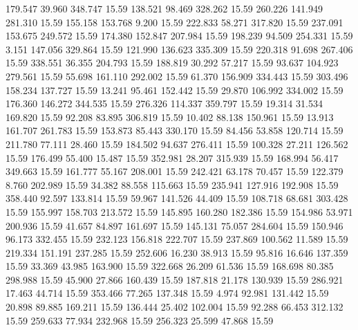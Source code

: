  179.547   39.960  348.747        15.59
 138.521   98.469  328.262        15.59
 260.226  141.949  281.310        15.59
 155.158  153.768    9.200        15.59
 222.833   58.271  317.820        15.59
 237.091  153.675  249.572        15.59
 174.380  152.847  207.984        15.59
 198.239   94.509  254.331        15.59
   3.151  147.056  329.864        15.59
 121.990  136.623  335.309        15.59
 220.318   91.698  267.406        15.59
 338.551   36.355  204.793        15.59
 188.819   30.292   57.217        15.59
  93.637  104.923  279.561        15.59
  55.698  161.110  292.002        15.59
  61.370  156.909  334.443        15.59
 303.496  158.234  137.727        15.59
  13.241   95.461  152.442        15.59
  29.870  106.992  334.002        15.59
 176.360  146.272  344.535        15.59
 276.326  114.337  359.797        15.59
  19.314   31.534  169.820        15.59
  92.208   83.895  306.819        15.59
  10.402   88.138  150.961        15.59
  13.913  161.707  261.783        15.59
 153.873   85.443  330.170        15.59
  84.456   53.858  120.714        15.59
 211.780   77.111   28.460        15.59
 184.502   94.637  276.411        15.59
 100.328   27.211  126.562        15.59
 176.499   55.400   15.487        15.59
 352.981   28.207  315.939        15.59
 168.994   56.417  349.663        15.59
 161.777   55.167  208.001        15.59
 242.421   63.178   70.457        15.59
 122.379    8.760  202.989        15.59
  34.382   88.558  115.663        15.59
 235.941  127.916  192.908        15.59
 358.440   92.597  133.814        15.59
  59.967  141.526   44.409        15.59
 108.718   68.681  303.428        15.59
 155.997  158.703  213.572        15.59
 145.895  160.280  182.386        15.59
 154.986   53.971  200.936        15.59
  41.657   84.897  161.697        15.59
 145.131   75.057  284.604        15.59
 150.946   96.173  332.455        15.59
 232.123  156.818  222.707        15.59
 237.869  100.562   11.589        15.59
 219.334  151.191  237.285        15.59
 252.606   16.230   38.913        15.59
  95.816   16.646  137.359        15.59
  33.369   43.985  163.900        15.59
 322.668   26.209   61.536        15.59
 168.698   80.385  298.988        15.59
  45.900   27.866  160.439        15.59
 187.818   21.178  130.939        15.59
 286.921   17.463   44.714        15.59
 353.466   77.265  137.348        15.59
   4.974   92.981  131.442        15.59
  20.898   89.885  169.211        15.59
 136.444   25.402  102.004        15.59
  92.288   66.453  312.132        15.59
 259.633   77.934  232.968        15.59
 256.323   25.599   47.868        15.59
